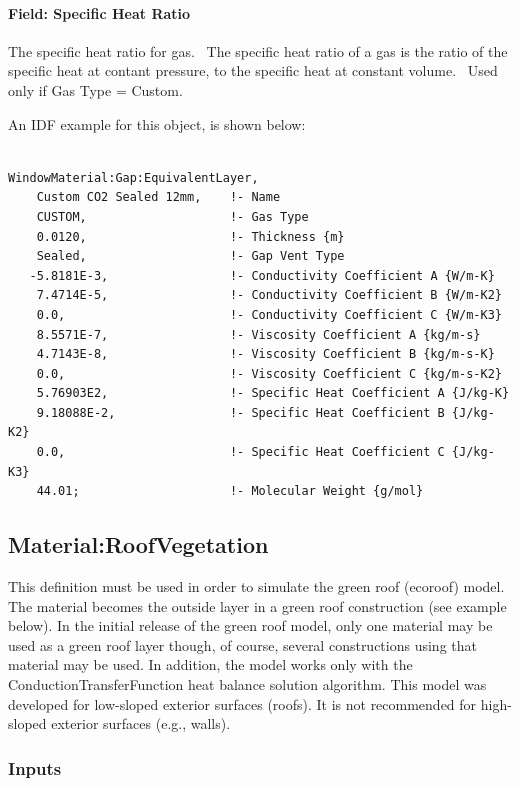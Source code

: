 \paragraph{Field: Specific Heat Ratio}\label{field-specific-heat-ratio-3}

The specific heat ratio for gas.~ The specific heat ratio of a gas is the ratio of the specific heat at contant pressure, to the specific heat at constant volume.~ Used only if Gas Type = Custom.

An IDF example for this object, is shown below:

\begin{lstlisting}

WindowMaterial:Gap:EquivalentLayer,
    Custom CO2 Sealed 12mm,    !- Name
    CUSTOM,                    !- Gas Type
    0.0120,                    !- Thickness {m}
    Sealed,                    !- Gap Vent Type
   -5.8181E-3,                 !- Conductivity Coefficient A {W/m-K}
    7.4714E-5,                 !- Conductivity Coefficient B {W/m-K2}
    0.0,                       !- Conductivity Coefficient C {W/m-K3}
    8.5571E-7,                 !- Viscosity Coefficient A {kg/m-s}
    4.7143E-8,                 !- Viscosity Coefficient B {kg/m-s-K}
    0.0,                       !- Viscosity Coefficient C {kg/m-s-K2}
    5.76903E2,                 !- Specific Heat Coefficient A {J/kg-K}
    9.18088E-2,                !- Specific Heat Coefficient B {J/kg-K2}
    0.0,                       !- Specific Heat Coefficient C {J/kg-K3}
    44.01;                     !- Molecular Weight {g/mol}
\end{lstlisting}

\subsection{Material:RoofVegetation}\label{materialroofvegetation}

This definition must be used in order to simulate the green roof (ecoroof) model. The material becomes the outside layer in a green roof construction (see example below). In the initial release of the green roof model, only one material may be used as a green roof layer though, of course, several constructions using that material may be used. In addition, the model works only with the ConductionTransferFunction heat balance solution algorithm. This model was developed for low-sloped exterior surfaces (roofs). It is not recommended for high-sloped exterior surfaces (e.g., walls).

\subsubsection{Inputs}\label{inputs-32-000}

